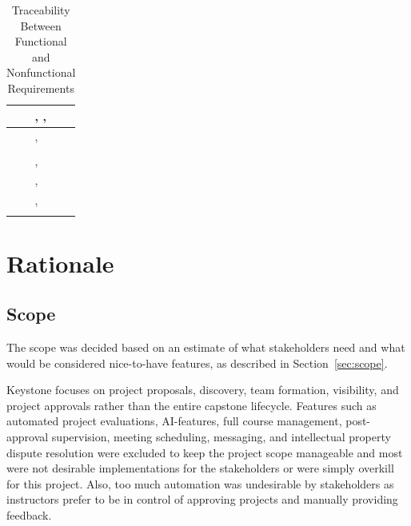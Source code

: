 \documentclass[12pt]{article}
\newcommand{\descriptiveid}[1]{\texttt{\detokenize{#1}}}
\newcommand{\idref}[1]{\hyperref[#1]{\descriptiveid{#1}}}
\newcommand{\rref}[1]{\idref{#1}}
\newcounter{tin}
\newcounter{cin}
\begin{document}
\begin{longtable}{p{} p{}}
    \rref{FR_UpdateEnrollment} & \idref{NFR_UsabilityFirstSuccess}, \idref{NFR_LearnUnassisted}, \idref{NFR_ConcurrencySafety} \\ \hline
    \rref{FR_EnrollmentDiscrepency} & \idref{NFR_ConcurrencySafety}, \idref{NFR_AuditLog} \\ \hline
    \rref{FR_NeedsGroup} & \idref{NFR_Authorize} \\ \hline
    \rref{FR_AssignTA} & \idref{NFR_Authorize}, \idref{NFR_ConcurrencySafety} \\ \hline
    \rref{FR_ExternalSupervisorVerification} & \idref{NFR_Authorize}, \idref{NFR_AuditLog} \\ \hline
    \rref{FR_ExternalSupervisorScope} & \idref{NFR_Authorize}, \idref{NFR_EssentialPersonal} \\ \hline
    \bottomrule
    \caption{Traceability Between Functional and Nonfunctional Requirements}
    \label{tab:FR2Rtm}

  \end{longtable}


  \section{Rationale}


  \subsection{Scope}

  The scope was decided based on an estimate of what stakeholders need and what would be considered nice-to-have features, as described in Section~\ref{sec:scope}.

  Keystone focuses on project proposals, discovery, team formation, visibility, and project approvals rather than 
  the entire capstone lifecycle. Features such as automated project evaluations, AI-features, full course management, 
  post-approval supervision, meeting scheduling, messaging, and intellectual property dispute resolution were excluded to 
  keep the project scope manageable and most were not desirable implementations for the stakeholders or were simply 
  overkill for this project. Also, too much automation was undesirable by stakeholders as instructors prefer to be in 
  control of approving projects and manually providing feedback.
\end{document}
